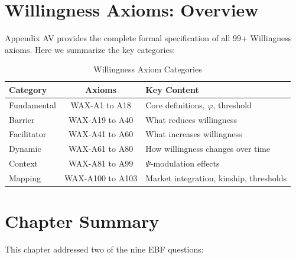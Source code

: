 \documentclass[11pt,a4paper]{book}
\theoremstyle{definition}
\theoremstyle{remark}
\begin{document}
\section{Willingness Axioms: Overview}
\label{sec:12-axioms}

Appendix AV provides the complete formal specification of all 99+ Willingness axioms. Here we summarize the key categories:

\begin{table}[htbp]
\centering
\caption{Willingness Axiom Categories}
\begin{tabular}{lcp{6cm}}
\toprule
\textbf{Category} & \textbf{Axioms} & \textbf{Key Content}\\
\midrule
Fundamental & WAX-A1 to A18 & Core definitions, $\varphi$, threshold\\
Barrier & WAX-A19 to A40 & What reduces willingness\\
Facilitator & WAX-A41 to A60 & What increases willingness\\
Dynamic & WAX-A61 to A80 & How willingness changes over time\\
Context & WAX-A81 to A99 & $\Psi$-modulation effects\\
Mapping & WAX-A100 to A103 & Market integration, kinship, thresholds\\
\bottomrule
\end{tabular}
\end{table}

\section{Chapter Summary}
\label{sec:12-summary}

This chapter addressed two of the nine EBF questions:
\end{document}

